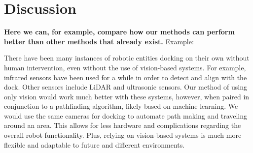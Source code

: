 \section{Discussion}
\textbf{Here we can, for example, compare how our methods can perform better than other methods that already exist.}
Example:

There have been many instances of robotic entities docking on their own without human intervention, even without the use of vision-based systems. For example, infrared sensors have been used for a while in order to detect and align with the dock. Other sensors include LiDAR and ultrasonic sensors. Our method of using only vision would work much better with these systems, however, when paired in conjunction to a pathfinding algorithm, likely based on machine learning. We would use the same cameras for docking to automate path making and traveling around an area. This allows for less hardware and complications regarding the overall robot functionality. Plus, relying on vision-based systems is much more flexible and adaptable to future and different environments.
